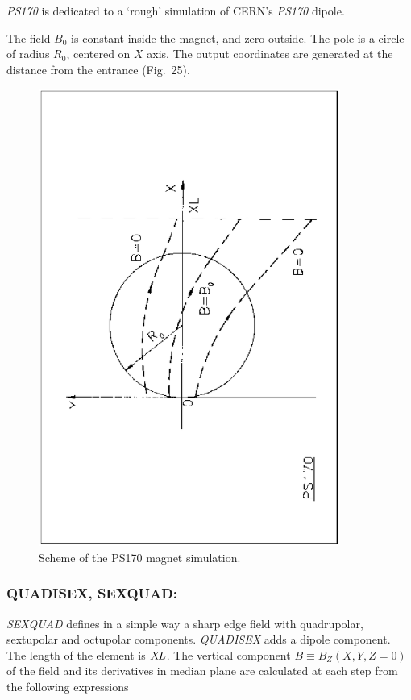 \textsl{PS170} is dedicated to a `rough' simulation
of CERN's \textsl{PS170} dipole.  
\bigskip

\noindent The field $ B_0 $ is constant inside the magnet, and zero outside. 
The pole is a circle  of radius $ R_0 $, centered on $ X $ axis.  The output coordinates are
generated at the distance \textsl{\XL} from the entrance (Fig.~25).  %
\vfill

\begin{figure}[H]
\centerline{\includegraphics[height=15cm,angle=-90]{Fig25.ps}}
\caption{\label{fig25}Scheme of the PS170 magnet simulation.}
\end{figure}
\vfill

\newpage

\subsubsection*{QUADISEX, SEXQUAD: \QUADISEXTitl} \label{QUADISEX}\label{SEXQUAD}
 

\textsl{SEXQUAD}    defines in a simple way a sharp edge field with quadrupolar, 
sextupolar and octupolar components. \textsl{QUADISEX}  adds a dipole component. The length of 
the element is $ X\!L $.  The vertical component $ B \equiv B_Z(X,Y,Z=0) $ of the field and its derivatives in median plane are 
calculated at each step from the following expressions 

